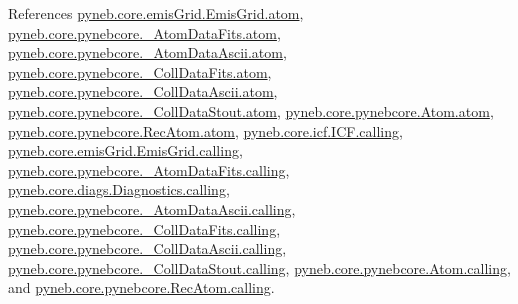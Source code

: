 References \hyperlink{emis_grid_8py_source_l00051}{pyneb.\-core.\-emis\-Grid.\-Emis\-Grid.\-atom}, \hyperlink{pynebcore_8py_source_l00089}{pyneb.\-core.\-pynebcore.\-\_\-\-Atom\-Data\-Fits.\-atom}, \hyperlink{pynebcore_8py_source_l00310}{pyneb.\-core.\-pynebcore.\-\_\-\-Atom\-Data\-Ascii.\-atom}, \hyperlink{pynebcore_8py_source_l00576}{pyneb.\-core.\-pynebcore.\-\_\-\-Coll\-Data\-Fits.\-atom}, \hyperlink{pynebcore_8py_source_l00926}{pyneb.\-core.\-pynebcore.\-\_\-\-Coll\-Data\-Ascii.\-atom}, \hyperlink{pynebcore_8py_source_l01162}{pyneb.\-core.\-pynebcore.\-\_\-\-Coll\-Data\-Stout.\-atom}, \hyperlink{pynebcore_8py_source_l01218}{pyneb.\-core.\-pynebcore.\-Atom.\-atom}, \hyperlink{pynebcore_8py_source_l02635}{pyneb.\-core.\-pynebcore.\-Rec\-Atom.\-atom}, \hyperlink{icf_8py_source_l00016}{pyneb.\-core.\-icf.\-I\-C\-F.\-calling}, \hyperlink{emis_grid_8py_source_l00044}{pyneb.\-core.\-emis\-Grid.\-Emis\-Grid.\-calling}, \hyperlink{pynebcore_8py_source_l00097}{pyneb.\-core.\-pynebcore.\-\_\-\-Atom\-Data\-Fits.\-calling}, \hyperlink{diags_8py_source_l00169}{pyneb.\-core.\-diags.\-Diagnostics.\-calling}, \hyperlink{pynebcore_8py_source_l00318}{pyneb.\-core.\-pynebcore.\-\_\-\-Atom\-Data\-Ascii.\-calling}, \hyperlink{pynebcore_8py_source_l00585}{pyneb.\-core.\-pynebcore.\-\_\-\-Coll\-Data\-Fits.\-calling}, \hyperlink{pynebcore_8py_source_l00936}{pyneb.\-core.\-pynebcore.\-\_\-\-Coll\-Data\-Ascii.\-calling}, \hyperlink{pynebcore_8py_source_l01156}{pyneb.\-core.\-pynebcore.\-\_\-\-Coll\-Data\-Stout.\-calling}, \hyperlink{pynebcore_8py_source_l01229}{pyneb.\-core.\-pynebcore.\-Atom.\-calling}, and \hyperlink{pynebcore_8py_source_l02643}{pyneb.\-core.\-pynebcore.\-Rec\-Atom.\-calling}.



